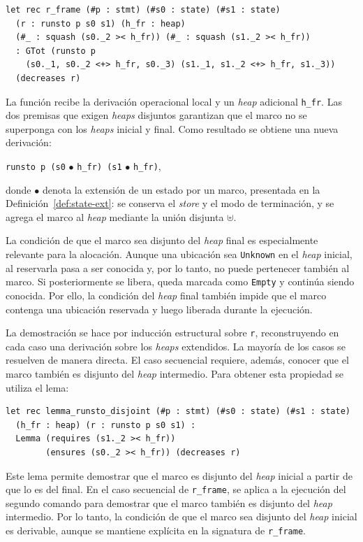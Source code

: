 \documentclass[a4paper,	11pt]{report}
\newif\ifdraft\drafttrue
\newcommand{\comm}[3]{\ifdraft{{\color{#1}[#2: #3]}}\fi}
\newcommand{\guido}[1]{\comm{blue}{Guido}{#1}}
\begin{document}
\begin{lstlisting}
let rec r_frame (#p : stmt) (#s0 : state) (#s1 : state)
  (r : runsto p s0 s1) (h_fr : heap)
  (#_ : squash (s0._2 >< h_fr)) (#_ : squash (s1._2 >< h_fr))
  : GTot (runsto p 
    (s0._1, s0._2 <+> h_fr, s0._3) (s1._1, s1._2 <+> h_fr, s1._3))
  (decreases r)
\end{lstlisting}

La función recibe la derivación operacional local y un \emph{heap} adicional \lstinline|h_fr|.
Las dos premisas que exigen \emph{heaps} disjuntos garantizan que el marco no se superponga con los \emph{heaps} inicial y final.
Como resultado se obtiene una nueva derivación:
\begin{center}
\lstinline|runsto p (s0| $\bullet$ \lstinline|h_fr) (s1| $\bullet$ \lstinline|h_fr)|,
\end{center}
donde $\bullet$ denota la extensión de un estado por un marco,
presentada en la Definición~\ref{def:state-ext}:
se conserva el \emph{store} y el modo de terminación,
y se agrega el marco al \emph{heap} mediante la unión disjunta $\uplus$.

La condición de que el marco sea disjunto del \emph{heap} final es especialmente relevante para la alocación.
Aunque una ubicación sea \lstinline|Unknown| en el \emph{heap} inicial,
al reservarla pasa a ser conocida y,
por lo tanto,
no puede pertenecer también al marco.
Si posteriormente se libera,
queda marcada como \lstinline|Empty| y continúa siendo conocida.
Por ello,
la condición del \emph{heap} final también impide que el marco contenga una ubicación reservada y luego liberada durante la ejecución.

La demostración se hace por inducción estructural sobre \lstinline|r|,
reconstruyendo en cada caso una derivación sobre los \emph{heaps} extendidos.
La mayoría de los casos se resuelven de manera directa.
El caso secuencial requiere,
además,
conocer que el marco también es disjunto del \emph{heap} intermedio.
Para obtener esta propiedad se utiliza el lema:

\begin{lstlisting}
let rec lemma_runsto_disjoint (#p : stmt) (#s0 : state) (#s1 : state)
  (h_fr : heap) (r : runsto p s0 s1) :
  Lemma (requires (s1._2 >< h_fr))
        (ensures (s0._2 >< h_fr)) (decreases r)
\end{lstlisting}

Este lema permite demostrar que el marco es disjunto del \emph{heap} inicial a partir de que lo es del final.
En el caso secuencial de \lstinline|r_frame|,
se aplica a la ejecución del segundo comando para demostrar que el marco también es disjunto del \emph{heap} intermedio.
Por lo tanto,
la condición de que el marco sea disjunto del \emph{heap} inicial es derivable,
aunque se mantiene explícita en la signatura de \lstinline|r_frame|.
\end{document}
